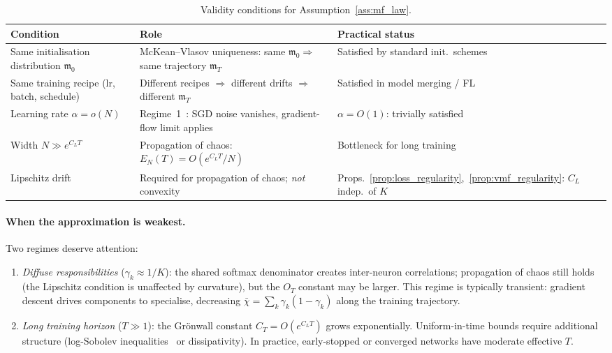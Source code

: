 \documentclass[11pt]{article}
\begin{document}
\begin{table}[H]
\centering\small
\renewcommand{\arraystretch}{1.15}
\caption{Validity conditions for Assumption~\ref{ass:mf_law}.}
\label{tab:a5_validity}
\begin{tabular}{@{}p{3.8cm}p{5.2cm}p{3.6cm}@{}}
\toprule
\textbf{Condition} & \textbf{Role} & \textbf{Practical status} \\
\midrule
Same initialisation distribution $\mathfrak{m}_0$
  & McKean--Vlasov uniqueness: same $\mathfrak{m}_0 \Rightarrow$ same trajectory $\mathfrak{m}_T$
  & Satisfied by standard init.\ schemes \\
\addlinespace
Same training recipe (lr, batch, schedule)
  & Different recipes $\Rightarrow$ different drifts $\Rightarrow$ different $\mathfrak{m}_T$
  & Satisfied in model merging / FL \\
\addlinespace
Learning rate $\alpha = o(N)$
  & Regime~1~\cite{debortoli2020}: SGD noise vanishes, gradient-flow limit applies
  & $\alpha = O(1)$: trivially satisfied \\
\addlinespace
Width $N \gg e^{C_L T}$
  & Propagation of chaos: $E_N(T) = O(e^{C_L T}/N)$
  & Bottleneck for long training \\
\addlinespace
Lipschitz drift
  & Required for propagation of chaos; \emph{not} convexity
  & Props.~\ref{prop:loss_regularity},~\ref{prop:vmf_regularity}: $C_L$ indep.\ of $K$ \\
\bottomrule
\end{tabular}
\end{table}

\paragraph{When the approximation is weakest.}
Two regimes deserve attention:
\begin{enumerate}[label=(\roman*),leftmargin=*,itemsep=2pt]
  \item \emph{Diffuse responsibilities} ($\gamma_k \approx 1/K$):
    the shared softmax denominator creates inter-neuron correlations;
    propagation of chaos still holds (the Lipschitz condition is
    unaffected by curvature), but the $O_T$ constant may be larger.
    This regime is typically transient: gradient descent drives
    components to specialise, decreasing
    $\bar\chi = \sum_k \gamma_k(1-\gamma_k)$ along the training
    trajectory.
  \item \emph{Long training horizon} ($T \gg 1$):
    the Gr\"{o}nwall constant $C_T = O(e^{C_L T})$ grows
    exponentially.
    Uniform-in-time bounds require additional structure (log-Sobolev
    inequalities~\cite{suzuki2023mfld} or dissipativity).
    In practice, early-stopped or converged networks have moderate
    effective $T$.
\end{enumerate}
\end{document}
